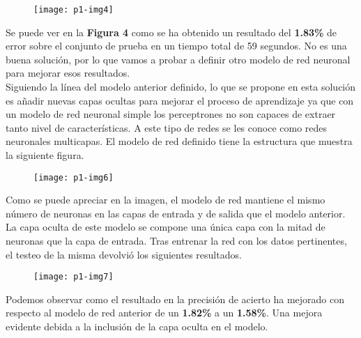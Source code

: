 \documentclass[10pt]{article}
\begin{document}
\begin{figure}[H]
	\begin{center}
 		\texttt{[image: p1-img4]}
	\end{center} 
\end{figure}

Se puede ver en la \textbf{Figura 4} como se ha obtenido un resultado del \textbf{1.83\%} de error sobre el conjunto de prueba en un tiempo total de 59 segundos. No es una buena solución, por lo que vamos a probar a definir otro modelo de red neuronal para mejorar esos resultados. \\

Siguiendo la línea del modelo anterior definido, lo que se propone en esta solución es añadir nuevas capas ocultas para mejorar el proceso de aprendizaje ya que con un modelo de red neuronal simple los perceptrones no son capaces de extraer tanto nivel de características. A este tipo de redes se les conoce como redes neuronales multicapas. El modelo de red definido tiene la estructura que muestra la siguiente figura. \\

\begin{figure}[H]
	\begin{center}
 		\texttt{[image: p1-img6]}
	\end{center} 
\end{figure}

Como se puede apreciar en la imagen, el modelo de red mantiene el mismo número de neuronas en las capas de entrada y de salida que el modelo anterior. La capa oculta de este modelo se compone una única capa con la mitad de neuronas que la capa de entrada. Tras entrenar la red con los datos pertinentes, el testeo de la misma devolvió los siguientes resultados. \\

\begin{figure}[H]
	\begin{center}
 		\texttt{[image: p1-img7]}
	\end{center} 
\end{figure}

Podemos observar como el resultado en la precisión de acierto ha mejorado con respecto al modelo de red anterior de un \textbf{1.82\%} a un \textbf{1.58\%}. Una mejora evidente debida a la inclusión de la capa oculta en el modelo. \\
\end{document}

